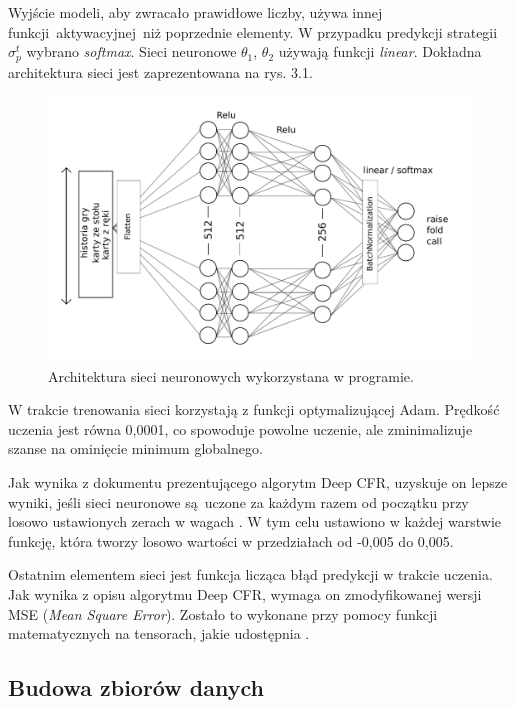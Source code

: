\documentclass[12pt,oneside,a4paper]{report}
\begin{document}
Wyjście modeli, aby zwracało prawidłowe liczby, używa innej funkcji aktywacyjnej niż poprzednie
elementy. W przypadku predykcji
strategii $\sigma_{p}^{t}$ wybrano \emph{softmax}. 
Sieci neuronowe $\theta_{1}$, $\theta_{2}$ używają funkcji \emph{linear}.
Dokładna architektura sieci jest zaprezentowana na rys. 3.1.


\begin{figure}[!ht]
  \centering
  \includegraphics[width=1\textwidth]{./img/nn.pdf}
  \caption{Architektura sieci neuronowych wykorzystana w programie.}
\end{figure}


W trakcie trenowania sieci korzystają z funkcji optymalizującej Adam.
Prędkość uczenia jest równa 0,0001, co spowoduje powolne uczenie, ale zminimalizuje szanse na
ominięcie minimum globalnego. 

Jak wynika z dokumentu prezentującego algorytm Deep CFR, uzyskuje on lepsze wyniki, jeśli sieci
neuronowe są uczone za każdym razem od początku przy losowo ustawionych zerach w wagach \cite{DCFR}. 
W tym celu ustawiono w każdej warstwie funkcję, która tworzy losowo wartości w przedziałach od
-0,005 do 0,005.

Ostatnim elementem sieci jest funkcja licząca błąd predykcji w trakcie uczenia. Jak wynika z 
opisu algorytmu Deep CFR, wymaga on zmodyfikowanej wersji MSE (\emph{Mean Square Error}).
Zostało to wykonane przy pomocy 
funkcji matematycznych na tensorach, jakie udostępnia  \cite{tensorflow}.


\subsection{Budowa zbiorów danych}
\end{document}

